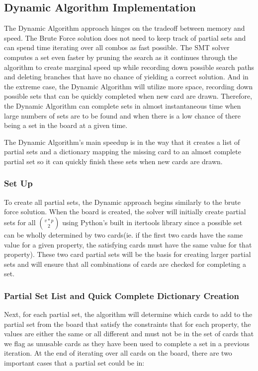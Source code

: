 \documentclass[pageno]{jpaper}
\begin{document}
\subsection{Dynamic Algorithm Implementation}

The Dynamic Algorithm approach hinges on the tradeoff between memory and speed. The Brute Force solution does not need to keep track of partial sets and can spend time iterating over all combos as fast possible. The SMT solver computes a set even faster by pruning the search as it continues through the algorithm to create marginal speed up while recording down possible search paths and deleting branches that have no chance of yielding a correct solution. And in the extreme case, the Dynamic Algorithm will utilize more space, recording down possible sets that can be quickly completed when new card are drawn. Therefore, the Dynamic Algorithm can complete sets in almost instantaneous time when large numbers of sets are to be found and when there is a low chance of there being a set in the board at a given time. 

The Dynamic Algorithm's main speedup is in the way that it creates a list of partial sets and a dictionary mapping the missing card to an almost complete partial set so it can quickly finish these sets when new cards are drawn. 

\subsubsection{Set Up}

To create all partial sets, the Dynamic approach begins similarly to the brute force solution. When the board is created, the solver will initially create partial sets for all ${v*p}\choose{2}$ using Python's built in itertools library since a possible set can be wholly determined by two cards(ie. if the first two cards have the same value for a given property, the satisfying cards must have the same value for that property). These two card partial sets will be the basis for creating larger partial sets and will ensure that all combinations of cards are checked for completing a set. 

\subsubsection{Partial Set List and Quick Complete Dictionary Creation}

Next, for each partial set, the algorithm will determine which cards to add to the partial set from the board that satisfy the constraints that for each property, the values are either the same or all different and must not be in the set of cards that we flag as unusable cards as they have been used to complete a set in a previous iteration. At the end of iterating over all cards on the board, there are two important cases that a partial set could be in:
\end{document}
